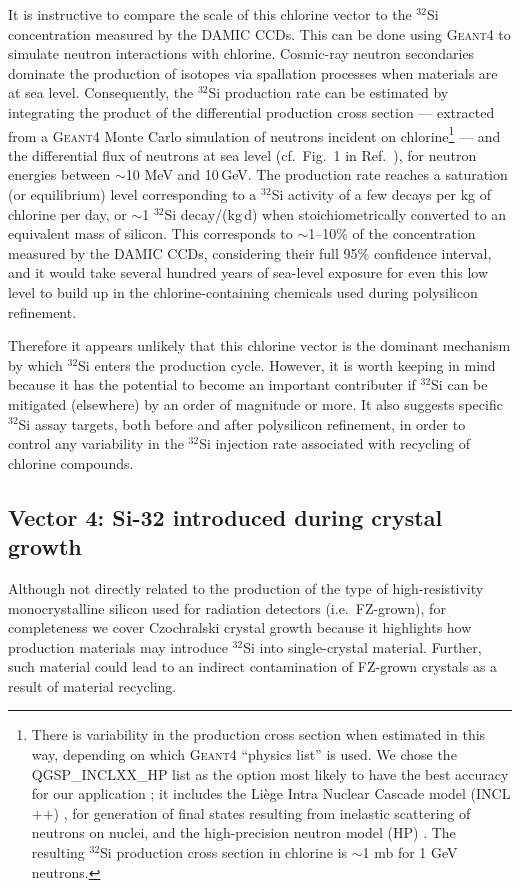 \documentclass[final,5p]{elsarticle}
\def\si{$^{32}$Si\xspace}
\begin{document}
It is instructive to compare the scale of this chlorine vector to the \si concentration measured by the DAMIC CCDs. This can be done using \textsc{Geant4} \cite{geant,geant_other} to simulate neutron interactions with chlorine.  Cosmic-ray neutron secondaries dominate the production of isotopes via spallation processes when materials are at sea level. Consequently, the \si production rate can be estimated by integrating the product of the differential production cross section --- extracted from a \textsc{Geant4} Monte Carlo simulation of neutrons incident on chlorine\footnote{There is variability in the production cross section when estimated in this way, depending on which \textsc{Geant4} ``physics list'' is used. We chose the QGSP\_INCLXX\_HP list as the option most likely to have the best accuracy for our application \cite{dennis}; it includes the Li\`{e}ge Intra Nuclear Cascade model (INCL$+$$+$) \cite{INCLXX}, for generation of final states resulting from inelastic scattering of neutrons on nuclei, and the high-precision neutron model (HP) \cite{geant_physics}. The resulting \si production cross section in chlorine is $\sim$1 mb for 1 GeV neutrons.} --- and the differential flux of neutrons at sea level \cite{mei,gordon} (cf.\ Fig.~1 in Ref.~\cite{mei}), for neutron energies between $\sim$10 MeV and 10\,GeV.  The production rate reaches a saturation (or equilibrium) level corresponding to a \si activity of a few decays per kg of chlorine per day, or $\sim$1 \si decay/(kg\,d) when stoichiometrically converted to an equivalent mass of silicon.  This corresponds to $\sim$1--10\% of the concentration measured by the DAMIC CCDs, considering their full 95\% confidence interval, and it would take several hundred years of sea-level exposure for even this low level to build up in the chlorine-containing chemicals used during polysilicon refinement.  

Therefore it appears unlikely that this chlorine vector is the dominant mechanism by which \si enters  the production cycle. However, it is worth keeping in mind because it has the potential to become an important contributer if \si can be mitigated (elsewhere) by an order of magnitude or more.  It also suggests specific \si assay targets, both before and after polysilicon refinement, in order to control any variability in the \si injection rate associated with recycling of chlorine compounds.

\subsection{Vector 4: Si-32 introduced during crystal growth}\label{ssec:vector4}
Although not directly related to the production of the type of high-resistivity monocrystalline silicon used for radiation detectors (i.e.\ FZ-grown), for completeness we cover Czochralski crystal growth because it highlights how production materials may introduce \si into single-crystal material.  Further, such material could lead to an indirect contamination of FZ-grown crystals as a result of material recycling.
\end{document}
